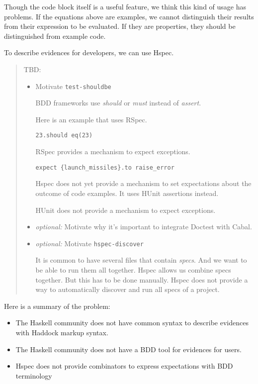 \documentclass[preprint]{sigplanconf}
\begin{document}
\noindent Though the code block itself is a useful feature,
we think this kind of usage has problems.
If the equations above are examples, we cannot distinguish
their results from their expression to be evaluated.
If they are properties, they should be distinguished
from example code.

To describe evidences for developers, we can use Hspec.

\begin{quote}
    TBD:
\begin{itemize}
    \item Motivate \verb|test-shouldbe|

        BDD frameworks use \emph{should} or \emph{must} instead of
        \emph{assert}.

        Here is an example that uses RSpec.

        \begin{verbatim}
23.should eq(23)
        \end{verbatim}

        RSpec provides a mechanism to expect exceptions.

        \begin{verbatim}
expect {launch_missiles}.to raise_error
        \end{verbatim}

        Hspec does not yet provide a mechanism to set expectations
        about the outcome of code examples.  It uses HUnit assertions
        instead.

        HUnit does not provide a mechanism to expect exceptions.

    \item \emph{optional:} Motivate why it's important to integrate
        Doctest with
        Cabal.

    \item \emph{optional:} Motivate \verb|hspec-discover|

        It is common to have several files that contain \emph{specs}.
        And we want to be able to run them all together.  Hspec allows
        us combine specs together.  But this has to be done manually.
        Hspec does not provide a way to automatically discover and run
        all specs of a project.
\end{itemize}
\end{quote}

Here is a summary of the problem:

\begin{itemize}
\item
    The Haskell community does not have common syntax to describe
    evidences with Haddock markup syntax.
\item
    The Haskell community does not have a BDD tool for
    evidences for users.
\item
    Hspec does not provide combinators to express expectations with
    BDD terminology
\end{itemize}
\end{document}
